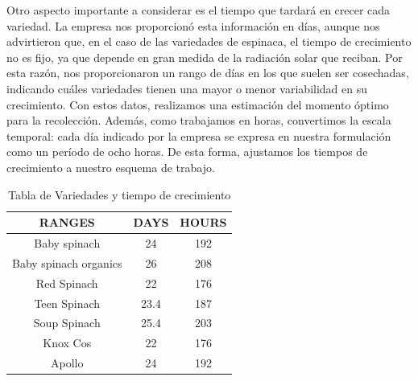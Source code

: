 Otro aspecto importante a considerar es el tiempo que tardará en crecer cada variedad. La empresa nos proporcionó esta 
información en días, aunque nos advirtieron que, en el caso de las variedades de espinaca, el tiempo de crecimiento no es fijo,
 ya que depende en gran medida de la radiación solar que reciban. Por esta razón, nos proporcionaron un rango de días en los que 
 suelen ser cosechadas, indicando cuáles variedades tienen una mayor o menor variabilidad en su crecimiento. Con estos datos, 
 realizamos una estimación del momento óptimo para la recolección. Además, como trabajamos en horas, convertimos la escala temporal:
 cada día indicado por la empresa se expresa en nuestra formulación como un período de ocho horas. De esta forma, ajustamos los tiempos 
 de crecimiento a nuestro esquema de trabajo.
\begin{table}[ht!]
    \centering
    \begin{minipage}{0.48\textwidth}
        \centering
        \begin{tabular}{|c|c|c|}
            \hline
            \rowcolor{gray!30} \textbf{\textcolor{grey3}{RANGES}} & \textbf{\textcolor{grey3}{DAYS}} &  \textbf{\textcolor{grey3}{HOURS}}\\ 
            \hline
            Baby spinach   & 24 & 192 \\ \hline
            Baby spinach organics  & 26 & 208\\ \hline
            Red Spinach              & 22 & 176\\ \hline
            Teen Spinach           & 23.4 & 187\\ \hline
            Soup Spinach & 25.4 & 203 \\ \hline
            Knox Cos     & 22 & 176 \\ \hline
            Apollo      & 24 & 192 \\ \hline
             
            \hline
        \end{tabular}
        \caption{Tabla de Variedades y tiempo de crecimiento}
        \label{tab:Variedades-crecimiento}
    \end{minipage}
    \hfill
\end{table}

